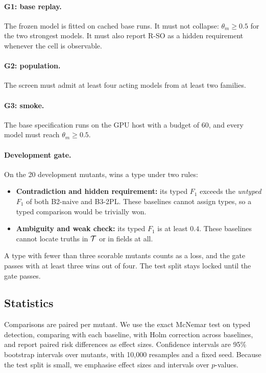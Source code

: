 \paragraph{G1: base replay.} The frozen model is fitted on cached base runs. It must not collapse: $\theta_m\ge0.5$ for the two strongest models. It must also report R-SO as a hidden requirement whenever the cell is observable.

\paragraph{G2: population.} The screen must admit at least four acting models from at least two families.

\paragraph{G3: smoke.} The base specification runs on the GPU host with a budget of 60, and every model must reach $\theta_m\ge0.5$.

\paragraph{Development gate.} On the 20 development mutants, \specdx wins a type under two rules:
\begin{itemize}[leftmargin=*]
\item \textbf{Contradiction and hidden requirement:} its typed $F_1$ exceeds the \emph{untyped} $F_1$ of both B2-naive and B3-2PL. These baselines cannot assign types, so a typed comparison would be trivially won.
\item \textbf{Ambiguity and weak check:} its typed $F_1$ is at least $0.4$. These baselines cannot locate truths in $\mathcal{T}$ or in fields at all.
\end{itemize}
A type with fewer than three scorable mutants counts as a loss, and the gate passes with at least three wins out of four. The test split stays locked until the gate passes.

\subsection{Statistics}

Comparisons are paired per mutant. We use the exact McNemar test on typed detection, comparing \specdx with each baseline, with Holm correction across baselines, and report paired risk differences as effect sizes. Confidence intervals are 95\% bootstrap intervals over mutants, with 10{,}000 resamples and a fixed seed. Because the test split is small, we emphasise effect sizes and intervals over $p$-values.

